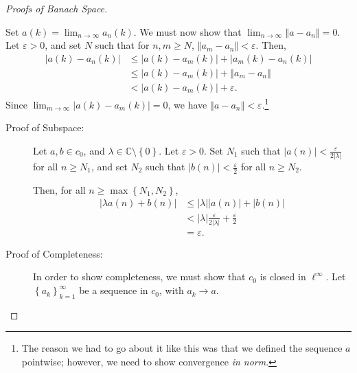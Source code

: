 \documentclass[10pt]{extarticle}
\newcommand{\C}{\mathbb{C}}
\newcommand{\norm}[1]{\left\Vert #1\right\Vert}
\newcommand{\set}[1]{\left\{#1\right\}}
\newcommand{\ve}{\varepsilon}
\theoremstyle{plain}
\theoremstyle{definition}
\theoremstyle{note}
\renewcommand{\newline}{\hfill\break}
\begin{document}
\begin{proof}[Proofs of Banach Space]
\begin{description}[font = \normalfont]
\begin{description}
          Set $a(k) = \lim_{n\rightarrow\infty}a_n(k)$. We must now show that $\lim_{n\rightarrow\infty}\norm{a - a_n} = 0$. Let $\ve > 0$, and set $N$ such that for $n,m\geq N$, $\norm{a_m - a_n} < \ve$. Then,
          \begin{align*}
            \left\vert a(k) - a_n(k) \right\vert &\leq \left\vert a(k) - a_m(k) \right\vert + \left\vert a_m(k) - a_n(k) \right\vert\\
                                                 &\leq \left\vert a(k) - a_m(k) \right\vert + \norm{a_m - a_n}\\
                                                 &< \left\vert a(k) - a_m(k) \right\vert + \ve.
          \end{align*}
          Since $\lim_{m\rightarrow\infty} \left\vert a(k) - a_m(k) \right\vert = 0$, we have $\norm{a - a_n} < \ve$.\footnote{The reason we had to go about it like this was that we defined the sequence $a$ pointwise; however, we need to show convergence \textit{in norm}.}
      \end{description}
    \item[$c_0$:]\hfill
      \begin{description}
        \item[Proof of Subspace:] Let $a,b\in c_0$, and $\lambda \in \C\setminus \set{0}$. Let $\ve > 0$. Set $N_1$ such that $|a(n)| < \frac{\ve}{2|\lambda|}$ for all $n\geq N_1$, and set $N_2$ such that $|b(n)| < \frac{\ve}{2}$ for all $n \geq N_2$.\newline

          Then, for all $n \geq \max\set{N_1,N_2}$,
          \begin{align*}
            |\lambda a(n) + b(n)| &\leq |\lambda||a(n)| + |b(n)|\\
                                  &< |\lambda|\frac{\ve}{2|\lambda|} + \frac{\ve}{2}\\
                                  &= \ve.
          \end{align*}
        \item[Proof of Completeness:] In order to show completeness, we must show that $c_0$ is closed in $\ell^{\infty}$. Let $\set{a_k}_{k=1}^{\infty}$ be a sequence in $c_0$, with $a_k \rightarrow a$.\newline


\end{description}
\end{description}
\end{proof}
\end{document}
